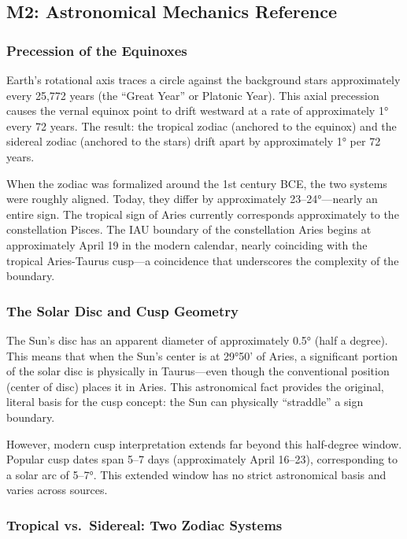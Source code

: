 \documentclass[11pt,letterpaper]{article}
\begin{document}
\subsection{M2: Astronomical Mechanics Reference}

\subsubsection{Precession of the Equinoxes}

Earth's rotational axis traces a circle against the background stars approximately every 25,772 years (the ``Great Year'' or Platonic Year). This axial precession causes the vernal equinox point to drift westward at a rate of approximately 1° every 72 years. The result: the tropical zodiac (anchored to the equinox) and the sidereal zodiac (anchored to the stars) drift apart by approximately 1° per 72 years.

When the zodiac was formalized around the 1st century BCE, the two systems were roughly aligned. Today, they differ by approximately 23--24°---nearly an entire sign. The tropical sign of Aries currently corresponds approximately to the constellation Pisces. The IAU boundary of the constellation Aries begins at approximately April 19 in the modern calendar, nearly coinciding with the tropical Aries-Taurus cusp---a coincidence that underscores the complexity of the boundary.

\subsubsection{The Solar Disc and Cusp Geometry}

The Sun's disc has an apparent diameter of approximately 0.5° (half a degree). This means that when the Sun's center is at 29°50' of Aries, a significant portion of the solar disc is physically in Taurus---even though the conventional position (center of disc) places it in Aries. This astronomical fact provides the original, literal basis for the cusp concept: the Sun can physically ``straddle'' a sign boundary.

However, modern cusp interpretation extends far beyond this half-degree window. Popular cusp dates span 5--7 days (approximately April 16--23), corresponding to a solar arc of 5--7°. This extended window has no strict astronomical basis and varies across sources.

\subsubsection{Tropical vs.\ Sidereal: Two Zodiac Systems}
\end{document}
